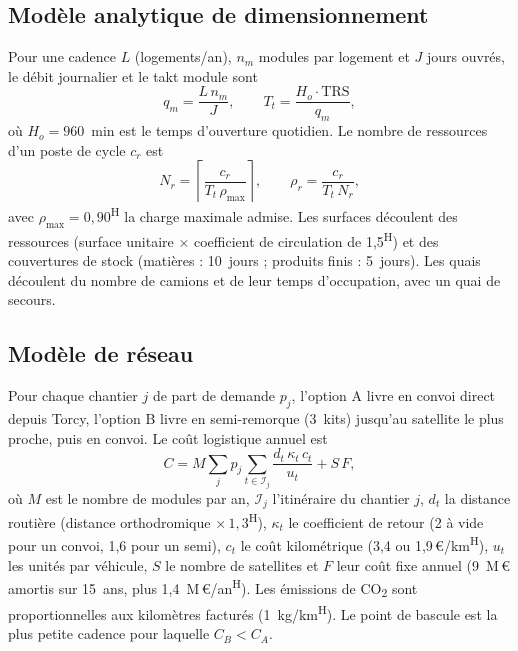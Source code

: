 \documentclass[11pt,a4paper]{article}
\newcommand{\EUR}{\,\euro}
\newcommand{\COdeux}{CO\textsubscript{2}}
\newcommand{\hyp}{\textsuperscript{\textsf{H}}}
\begin{document}
\subsection{Modèle analytique de dimensionnement}

Pour une cadence $L$ (logements/an), $n_m$ modules par logement et $J$ jours ouvrés, le débit
journalier et le takt module sont
\begin{equation}\label{eq:takt}
q_m = \frac{L\,n_m}{J}, \qquad T_t = \frac{H_o \cdot \mathrm{TRS}}{q_m},
\end{equation}
où $H_o = 960$~min est le temps d'ouverture quotidien. Le nombre de ressources d'un poste de
cycle $c_r$ est
\begin{equation}\label{eq:ressources}
N_r = \left\lceil \frac{c_r}{T_t\,\rho_{\max}} \right\rceil, \qquad
\rho_r = \frac{c_r}{T_t\,N_r},
\end{equation}
avec $\rho_{\max} = 0{,}90$\hyp{} la charge maximale admise. Les surfaces découlent des
ressources (surface unitaire $\times$ coefficient de circulation de 1,5\hyp) et des
couvertures de stock (matières : 10~jours ; produits finis : 5~jours). Les quais découlent du
nombre de camions et de leur temps d'occupation, avec un quai de secours.

\subsection{Modèle de réseau}

Pour chaque chantier $j$ de part de demande $p_j$, l'option A livre en convoi direct depuis
Torcy, l'option B livre en semi-remorque (3~kits) jusqu'au satellite le plus proche, puis en
convoi. Le coût logistique annuel est
\begin{equation}\label{eq:reseau}
C = M \sum_j p_j \sum_{t \in \mathcal{I}_j} \frac{d_t\,\kappa_t\,c_t}{u_t} + S\,F,
\end{equation}
où $M$ est le nombre de modules par an, $\mathcal{I}_j$ l'itinéraire du chantier $j$, $d_t$ la
distance routière (distance orthodromique $\times\,1{,}3$\hyp), $\kappa_t$ le coefficient de
retour (2 à vide pour un convoi, 1,6 pour un semi), $c_t$ le coût kilométrique (3,4 ou
1,9\EUR/km\hyp), $u_t$ les unités par véhicule, $S$ le nombre de satellites et $F$ leur coût
fixe annuel (9~M\EUR{} amortis sur 15~ans, plus 1,4~M\EUR/an\hyp). Les émissions de \COdeux{}
sont proportionnelles aux kilomètres facturés (1~kg/km\hyp). Le point de bascule est la plus petite
cadence pour laquelle $C_B < C_A$.
\end{document}
